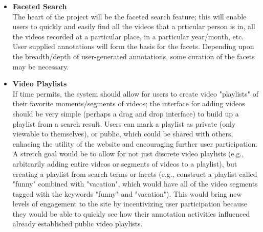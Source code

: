 \begin{itemize}[leftmargin=*]
\item \textbf{Faceted Search} \\
	The heart of the project will be the faceted search feature; this will enable users to quickly and easily find all the videos that a prticular person is in, all the videos recorded at a particular place, in a particular year/month, etc.  User supplied annotations will form the basis for the facets.  Depending upon the breadth/depth of user-generated annotations, some curation of the facets may be necessary.

\item \textbf{Video Playlists} \\
	If time permits, the system should allow for users to create video "playlists" of their favorite moments/segments of videos; the interface for adding videos should be very simple (perhaps a drag and drop interface) to build up a playlist from a search result.  Users can mark a playlist as private (only viewable to themselves), or public, which could be shared with others, enhacing the utility of the website and encouraging further user participation.  A stretch goal would be to allow for not just discrete video playlists (e.g., arbitrarily adding entire videos or segments of videos to a playlist), but creating a playlist from search terms or facets (e.g., construct a playlist called "funny" combined with "vacation", which would have all of the video segments tagged with the keywords "funny" and "vacation").  This would bring new levels of engagement to the site by incentivizing user participation because they would be able to quickly see how their annotation activities influenced already established public video playlists.

\end{itemize}


%
%
%


%
%
%
%
%

